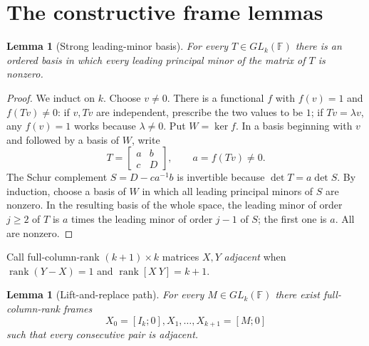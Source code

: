 \documentclass[11pt]{article}
\newtheorem{lemma}[theorem]{Lemma}
\newcommand{\F}{\mathbb F}
\newcommand{\rank}{\operatorname{rank}}
\begin{document}
\section{The constructive frame lemmas}

\begin{lemma}[Strong leading-minor basis]\label{lem:strong}
For every $T\in GL_k(\F)$ there is an ordered basis in which every leading
principal minor of the matrix of $T$ is nonzero.
\end{lemma}

\begin{proof}
We induct on $k$.  Choose $v\ne0$.  There is a functional $f$ with
$f(v)=1$ and $f(Tv)\ne0$: if $v,Tv$ are independent, prescribe the two
values to be $1$; if $Tv=\lambda v$, any $f(v)=1$ works because
$\lambda\ne0$.  Put $W=\ker f$.  In a basis beginning with $v$ and followed
by a basis of $W$, write
\[
 T=\begin{bmatrix}a&b\\c&D\end{bmatrix},\qquad a=f(Tv)\ne0.
\]
The Schur complement $S=D-ca^{-1}b$ is invertible because
$\det T=a\det S$.  By induction, choose a basis of $W$ in which all leading
principal minors of $S$ are nonzero.  In the resulting basis of the whole
space, the leading minor of order $j\ge2$ of $T$ is $a$ times the leading
minor of order $j-1$ of $S$; the first one is $a$.  All are nonzero.
\end{proof}

Call full-column-rank $(k+1)\times k$ matrices $X,Y$ \emph{adjacent} when
$\rank(Y-X)=1$ and $\rank[X\ Y]=k+1$.

\begin{lemma}[Lift-and-replace path]\label{lem:path}
For every $M\in GL_k(\F)$ there exist full-column-rank frames
\[
 X_0=[I_k;0],X_1,\ldots,X_{k+1}=[M;0]
\]
such that every consecutive pair is adjacent.
\end{lemma}
\end{document}
